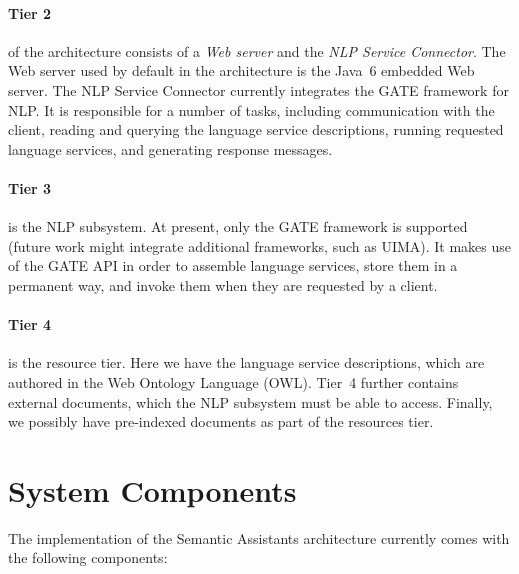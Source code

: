 \paragraph{Tier 2} of the architecture consists of a \emph{Web server}
and the \emph{NLP Service Connector}. The Web server used by default
in the architecture is the Java~6 embedded Web server.  The NLP
Service Connector currently integrates the GATE framework for NLP. It
is responsible for a number of tasks, including communication with the
client, reading and querying the language service descriptions,
running requested language services, and generating response messages.

\paragraph{Tier 3} is the NLP subsystem. At present, only the GATE
framework is supported (future work might integrate additional
frameworks, such as UIMA).  It makes use of the GATE API in order to
assemble language services, store them in a permanent way, and invoke
them when they are requested by a client.

\paragraph{Tier 4} is the resource tier.  Here we have the language
service descriptions, which are authored in the Web Ontology Language
(OWL).  Tier~4 further contains external documents, which the NLP
subsystem must be able to access. Finally, we possibly have
pre-indexed documents as part of the resources tier. 



\section{System Components}
\label{sec:syscomp}
The implementation of the Semantic Assistants architecture currently comes
with the following components:

